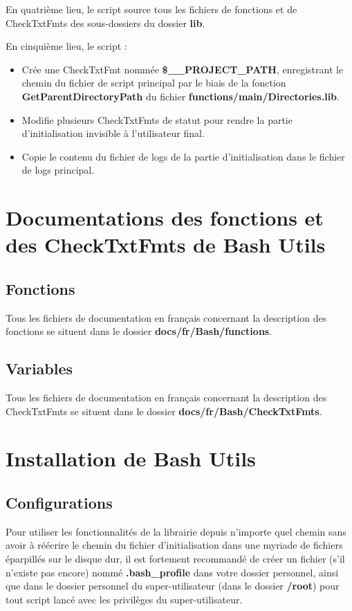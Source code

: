 \documentclass[a4paper,10pt]{article}
\begin{document}
En quatrième lieu, le script source tous les fichiers de fonctions et de CheckTxtFmts des sous-dossiers du dossier \color{lime}\textbf{lib}\color{white}.

En cinquième lieu, le script :
\begin{itemize}
    \item Crée une CheckTxtFmt nommée \color{orange}\textbf{\$\_\_PROJECT\_PATH}\color{white}, enregistrant le chemin du fichier de script principal par le biais de la fonction \color{mauve}\textbf{GetParentDirectoryPath} \color{white} du fichier \color{lime}\textbf{functions/main/Directories.lib}\color{white}.
    
    \item Modifie plusieurs CheckTxtFmts de statut pour rendre la partie d'initialisation invisible à l'utilisateur final.
    
    \item Copie le contenu du fichier de logs de la partie d'initialisation dans le fichier de logs principal.
\end{itemize}


\color{red}
\section{Documentations des fonctions et des CheckTxtFmts de Bash Utils}\color{white}

\color{green}
\subsection{Fonctions}\color{white}
Tous les fichiers de documentation en français concernant la description des fonctions se situent dans le dossier \color{lime}\textbf{docs/fr/Bash/functions}\color{white}.

\color{green}
\subsection{Variables}\color{white}
Tous les fichiers de documentation en français concernant la description des CheckTxtFmts se situent dans le dossier \color{lime}\textbf{docs/fr/Bash/CheckTxtFmts}\color{white}.

\color{red}
\section{Installation de Bash Utils}\color{white}

\color{green}
\subsection{Configurations}\color{white}
Pour utiliser les fonctionnalités de la librairie depuis n'importe quel chemin sans avoir à réécrire le chemin du fichier d'initialisation dans une myriade de fichiers éparpillés sur le disque dur, il est fortement recommandé de créer un fichier (s'il n'existe pas encore) nommé \color{lime}\textbf{.bash\_profile}\color{white} dans votre dossier personnel, ainsi que dans le dossier personnel du super-utilisateur (dans le dossier \color{lime}\textbf{/root}\color{white}) pour tout script lancé avec les privilèges du super-utilisateur.
\end{document}
